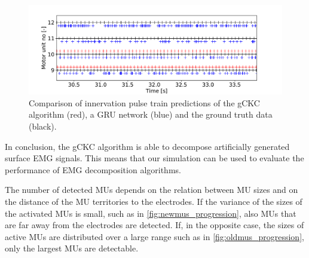 \begin{figure}
  \centering%
  \includegraphics[width=\textwidth]{images/results/application/gru2.pdf}%
  \caption{Comparison of innervation pulse train predictions of the gCKC algorithm (red), a GRU network (blue) and the ground truth data (black).}%
  \label{fig:gru_result}%
\end{figure}


In conclusion, the gCKC algorithm is able to decompose artificially generated surface EMG signals. This means that our simulation can be used to evaluate the performance of EMG decomposition algorithms.

The number of detected MUs depends on the relation between MU sizes and on the distance of the MU territories to the electrodes. If the variance of the sizes of the activated MUs is small, such as in \cref{fig:newmus_progression}, also MUs that are far away from the electrodes are detected. If, in the opposite case, the sizes of active MUs are distributed over a large range such as in \cref{fig:oldmus_progression}, only the largest MUs are detectable.

